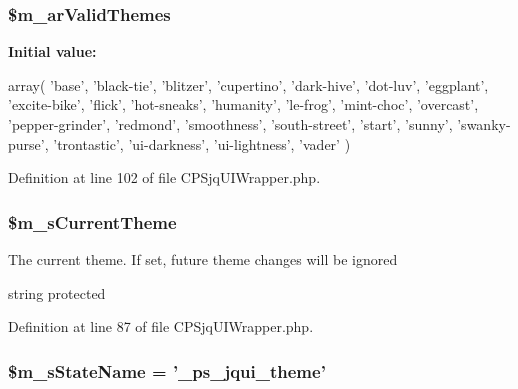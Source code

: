 \hypertarget{classCPSjqUIWrapper_aec85930491181c225f5c79d3e76213ee}{
\subsubsection[{\$m\_\-arValidThemes}]{\setlength{\rightskip}{0pt plus 5cm}\$m\_\-arValidThemes}}
\label{classCPSjqUIWrapper_aec85930491181c225f5c79d3e76213ee}
{\bfseries Initial value:}
\begin{DoxyCode}
 array(
        'base',
        'black-tie',
        'blitzer',
        'cupertino',
        'dark-hive',
        'dot-luv',
        'eggplant',
        'excite-bike',
        'flick',
        'hot-sneaks',
        'humanity',
        'le-frog',
        'mint-choc',
        'overcast',
        'pepper-grinder',
        'redmond',
        'smoothness',
        'south-street',
        'start',
        'sunny',
        'swanky-purse',
        'trontastic',
        'ui-darkness',
        'ui-lightness',
        'vader'
    )
\end{DoxyCode}


Definition at line 102 of file CPSjqUIWrapper.php.

\hypertarget{classCPSjqUIWrapper_a8d18b96a73f9da6408588268de922652}{
\subsubsection[{\$m\_\-sCurrentTheme}]{\setlength{\rightskip}{0pt plus 5cm}\$m\_\-sCurrentTheme}}
\label{classCPSjqUIWrapper_a8d18b96a73f9da6408588268de922652}
The current theme. If set, future theme changes will be ignored

string  protected 

Definition at line 87 of file CPSjqUIWrapper.php.

\hypertarget{classCPSjqUIWrapper_a1a8db3d93da0f822e3d07ce0a9fd1973}{
\subsubsection[{\$m\_\-sStateName}]{\setlength{\rightskip}{0pt plus 5cm}\$m\_\-sStateName = '\_\-ps\_\-jqui\_\-theme'}}
\label{classCPSjqUIWrapper_a1a8db3d93da0f822e3d07ce0a9fd1973}


